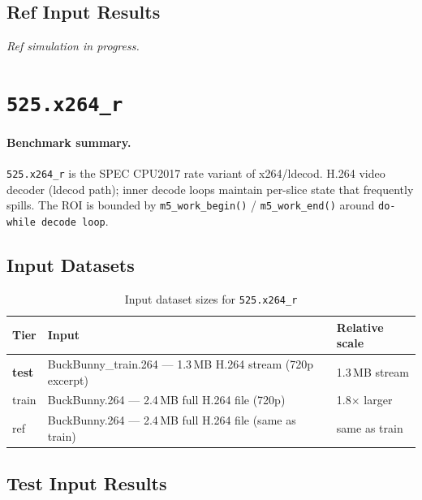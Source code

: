 \documentclass[11pt,a4paper]{article}
\begin{document}
\subsection{Ref Input Results}
\textit{Ref simulation in progress.}



\section{\texttt{525.x264\_r}}
\label{sec:x264}

\paragraph{Benchmark summary.}
\texttt{525.x264\_r} is the SPEC CPU2017 rate variant of x264/ldecod.
H.264 video decoder (ldecod path); inner decode loops maintain per-slice state that frequently spills.
The ROI is bounded by \texttt{m5\_work\_begin()} / \texttt{m5\_work\_end()}
around \texttt{do-while decode loop}.

\subsection{Input Datasets}

\begin{table}[H]
\centering
\caption{Input dataset sizes for \texttt{525.x264\_r}}
\label{tab:x264_inputs}
\small
\begin{tabular}{lp{8cm}l}
\toprule
\textbf{Tier} & \textbf{Input} & \textbf{Relative scale} \\
\midrule
\textbf{test} & BuckBunny\_train.264 --- 1.3\,MB H.264 stream (720p excerpt) & 1.3\,MB stream \\
train & BuckBunny.264 --- 2.4\,MB full H.264 file (720p) & 1.8$\times$ larger \\
ref & BuckBunny.264 --- 2.4\,MB full H.264 file (same as train) & same as train \\
\bottomrule
\end{tabular}
\end{table}

\subsection{Test Input Results}
\end{document}
